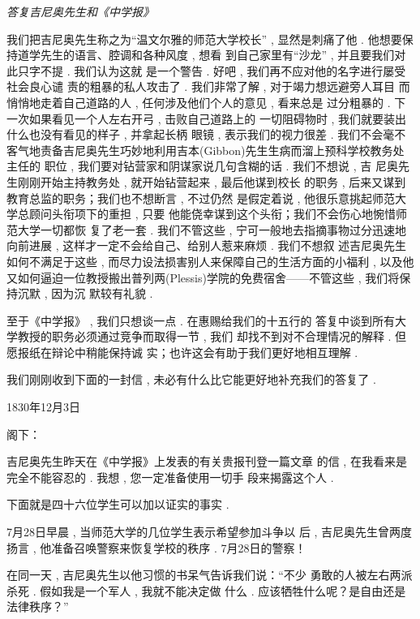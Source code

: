 \begin{center}
	\emph{答复吉尼奥先生和《中学报》}
\end{center}

我们把吉尼奥先生称之为“温文尔雅的师范大学校长” , 显然是刺痛了他 . 他想要保持道学先生的语言、腔调和各种风度 , 想看 到自己家里有“沙龙” , 并且要我们对此只字不提 . 我们认为这就 是一个警告 . 好吧 , 我们再不应对他的名字进行屡受社会良心谴 责的粗暴的私人攻击了 . 我们非常了解 , 对于竭力想远避旁人耳目 而悄悄地走着自己道路的人 , 任何涉及他们个人的意见 , 看来总是 过分粗暴的 . 下一次如果看见一个人左右开弓 , 击败自己道路上的 一切阻碍物时 , 我们就要装出什么也没有看见的样子 , 并拿起长柄 眼镜 , 表示我们的视力很差 . 我们不会毫不客气地责备吉尼奥先生巧妙地利用吉本(Gibbon)先生生病而溜上预科学校教务处主任的 职位 , 我们要对钻营家和阴谋家说几句含糊的话 . 我们不想说 , 吉 尼奥先生刚刚开始主持教务处 , 就开始钻营起来 , 最后他谋到校长 的职务 , 后来又谋到教育总监的职务；我们也不想断言 , 不过仍然 是假定着说 , 他很乐意挑起师范大学总顾问头衔项下的重担 , 只要 他能侥幸谋到这个头衔；我们不会伤心地惋惜师范大学一切都恢 复了老一套 . 我们不管这些 , 宁可一般地去指摘事物过分迅速地 向前进展 , 这样才一定不会给自己、给别人惹来麻烦 . 我们不想叙 述吉尼奥先生如何不满足于这些 , 而尽力设法损害别人来保障自己的生活方面的小福利 , 以及他又如何逼迫一位教授搬出普列两(Plessis)学院的免费宿舍——不管这些 , 我们将保持沉默 , 因为沉 默较有礼貌 . 

至于《中学报》 , 我们只想谈一点 . 在惠赐给我们的十五行的 答复中谈到所有大学教授的职务必须通过竞争而取得一节 , 我们 却找不到对不合理情况的解释 . 但愿报纸在辩论中稍能保持诚 实；也许这会有助于我们更好地相互理解 . 

我们刚刚收到下面的一封信 , 未必有什么比它能更好地补充我们的答复了 . 

\begin{flushright}
	1830年12月3日
\end{flushright}


阁下：

吉尼奥先生昨天在《中学报》上发表的有关贵报刊登一篇文章 的信 , 在我看来是完全不能容忍的 . 我想 , 您一定准备使用一切手 段来揭露这个人 . 

下面就是四十六位学生可以加以证实的事实 . 

7月28日早晨 , 当师范大学的几位学生表示希望参加斗争以 后 , 吉尼奥先生曾两度扬言 , 他准备召唤警察来恢复学校的秩序 .  7月28日的警察！

在同一天 , 吉尼奥先生以他习惯的书呆气告诉我们说：“不少 勇敢的人被左右两派杀死 . 假如我是一个军人 , 我就不能决定做 什么 . 应该牺牲什么呢？是自由还是法律秩序？”

